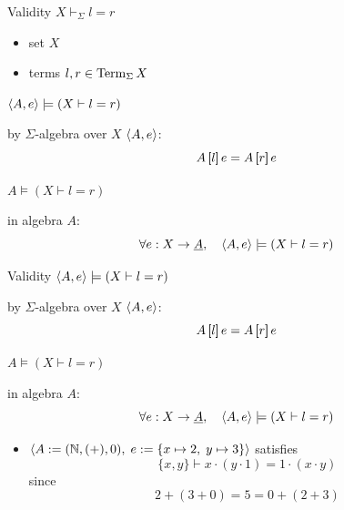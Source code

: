 \documentclass[10pt, english, xcolor={dvipsnames}]{beamer}
\begin{document}

\begin{frame}{Validity}
   $X \vdash_\Sigma l = r$ 
  \begin{itemize}
    \item set $X$
    \item terms $l, r \in \operatorname{Term}_\Sigma X$
  \end{itemize}

  \vspace{0.3cm}
   $\left\langle A, e \right\rangle \models (X \vdash l = r)$

  by $\Sigma$-algebra over $X$ $\left\langle A, e \right\rangle$: $$A\brak{l} e = A\brak{r} e$$

   $A \models (X \vdash l = r)$

  in algebra $A$:
  $$\forall e : X \to \underline{A},\quad \left\langle A, e \right\rangle \models (X \vdash l = r)$$
\end{frame}

\begin{frame}[t]{Validity}
   $\left\langle A, e \right\rangle \models (X \vdash l = r)$

  by $\Sigma$-algebra over $X$ $\left\langle A, e \right\rangle$: $$A\brak{l} e = A\brak{r} e$$

   $A \models (X \vdash l = r)$

  in algebra $A$:
  $$\forall e : X \to \underline{A},\quad \left\langle A, e \right\rangle \models (X \vdash l = r)$$

  \begin{itemize}
    \item $\left\langle A := (\mathbb N, (+), 0),\; e := \{x \mapsto 2,\; y \mapsto 3\} \right\rangle$ satisfies $$\{x, y\} \vdash x \cdot (y \cdot 1) = 1 \cdot (x \cdot y)$$
    since $$2 + (3 + 0) = 5 = 0 + (2 + 3)$$
  \end{itemize}
\end{frame}

\end{document}
